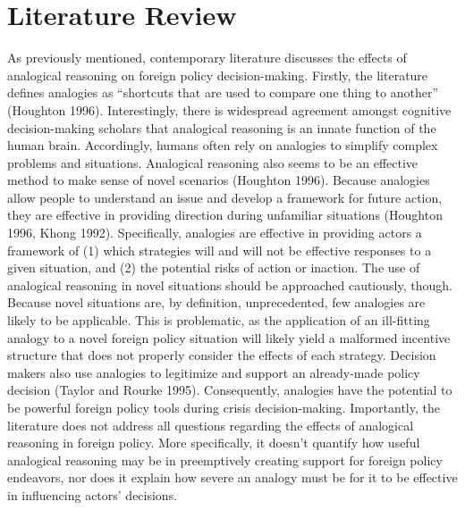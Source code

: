 \documentclass[12pt]{article}
\begin{document}
\section {Literature Review}
As previously mentioned, contemporary literature discusses the effects of analogical reasoning on foreign policy decision-making. Firstly, the literature defines analogies as “shortcuts that are used to compare one thing to another” (Houghton 1996). Interestingly, there is widespread agreement amongst cognitive decision-making scholars that analogical reasoning is an innate function of the human brain. Accordingly, humans often rely on analogies to simplify complex problems and situations.
\bigbreak
Analogical reasoning also seems to be an effective method to make sense of novel scenarios (Houghton 1996). Because analogies allow people to understand an issue and develop a framework for future action, they are effective in providing direction during unfamiliar situations (Houghton 1996, Khong 1992). Specifically, analogies are effective in providing actors a framework of (1) which strategies will and will not be effective responses to a given situation, and (2) the potential risks of action or inaction. The use of analogical reasoning in novel situations should be approached cautiously, though. Because novel situations are, by definition, unprecedented, few analogies are likely to be applicable. This is problematic, as the application of an ill-fitting analogy to a novel foreign policy situation will likely yield a malformed incentive structure that does not properly consider the effects of each strategy.
\bigbreak
Decision makers also use analogies to legitimize and support an already-made policy decision (Taylor and Rourke 1995). Consequently, analogies have the potential to be powerful foreign policy tools during crisis decision-making.
\bigbreak
Importantly, the literature does not address all questions regarding the effects of analogical reasoning in foreign policy. More specifically, it doesn’t quantify how useful analogical reasoning may be in preemptively creating support for foreign policy endeavors, nor does it explain how severe an analogy must be for it to be effective in influencing actors’ decisions.
\end{document}
